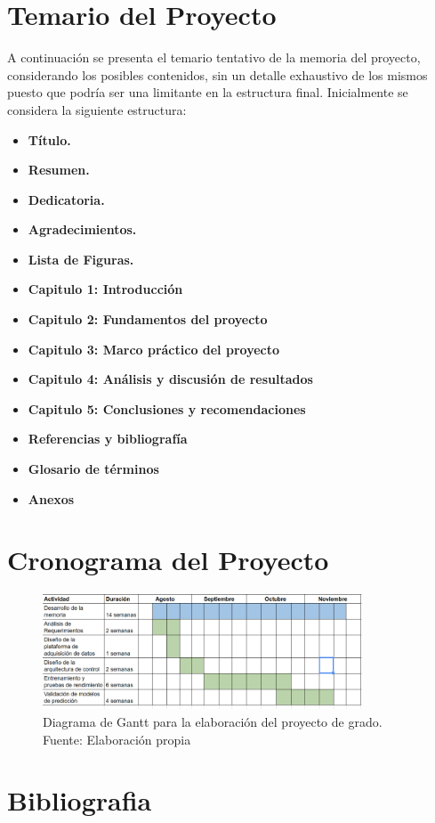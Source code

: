 \documentclass[12pt,letterpaper]{article}
\begin{document}
\section{Temario del Proyecto}
A continuación se presenta el temario tentativo de la memoria del proyecto, 
considerando los posibles contenidos, sin un detalle exhaustivo de los mismos 
puesto que podría ser una limitante en la estructura final. 
Inicialmente se considera la siguiente estructura:\\

\begin{itemize}

\item \textbf{Título.}

\item \textbf{Resumen.}

\item \textbf{Dedicatoria.}

\item \textbf{Agradecimientos.}

\item \textbf{Lista de Figuras.}

\item \textbf{Capitulo 1: Introducción}  

\item \textbf{Capitulo 2: Fundamentos del proyecto}  

\item \textbf{Capitulo 3: Marco práctico del proyecto} 

\item \textbf{Capitulo 4: Análisis y discusión de resultados}

\item \textbf{Capitulo 5: Conclusiones y recomendaciones}

\item \textbf{Referencias y bibliografía}

\item \textbf{Glosario de términos}

\item \textbf{Anexos}
\end{itemize}

\newpage
\section{Cronograma del Proyecto}

\begin{figure}[!ht] 
    \centering
    \includegraphics[width=0.85\textwidth]{cronograma}
    \caption{Diagrama de Gantt para la elaboración del proyecto de grado. Fuente: Elaboración propia}
    \label{fig:cronograma}
    \end{figure}

\newpage
\section{Bibliografia}



\end{document}
